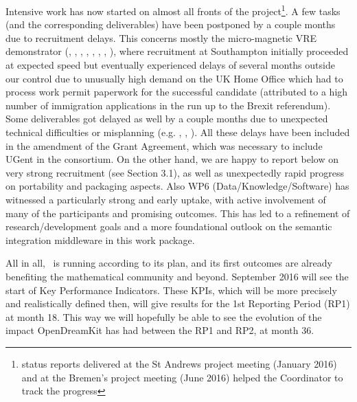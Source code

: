 \documentclass{deliverablereport}
\begin{document}
Intensive work has now started on almost all fronts of the
project\footnote{status reports delivered at the St Andrews project
  meeting (January 2016) and at the Bremen's project meeting (June
  2016) helped the Coordinator to track the progress}. A few tasks
(and the corresponding deliverables) have been postponed by a couple
months due to recruitment delays. This concerns mostly the
micro-magnetic VRE demonstrator
(,
,
,
,
,
,
,
), where recruitment
at Southampton initially proceeded at expected speed but eventually
experienced delays of several months outside our control due to unusually high demand on the UK Home
Office which had to process work permit paperwork for
the successful candidate (attributed to a high number of immigration applications in the run up to the
Brexit referendum). Some deliverables got
delayed as well by a couple months due to unexpected technical
difficulties or misplanning (e.g. ,
, ). All
these delays have been included in the amendment of the Grant
Agreement, which was necessary to include UGent in the
consortium. On the other hand, we are happy to report below on very
strong recruitment (see Section 3.1), as well as unexpectedly rapid
progress on portability and packaging aspects. Also WP6
(Data/Knowledge/Software) has witnessed a particularly strong and
early uptake, with active involvement of many of the participants and
promising outcomes. This has led to a refinement of research/development goals and a more
foundational outlook on the semantic integration middleware in this work package. 

All in all, \ODK\ is running according to its plan, and its first
outcomes are already benefiting the mathematical community and
beyond. September 2016 will see the start of Key Performance
Indicators.  These KPIs, which will be more precisely and
realistically defined then, will give results for the 1st Reporting
Period (RP1) at month 18.  This way we will hopefully be able to see the
evolution of the impact OpenDreamKit has had between the RP1 and RP2,
at month 36.


\end{document}
